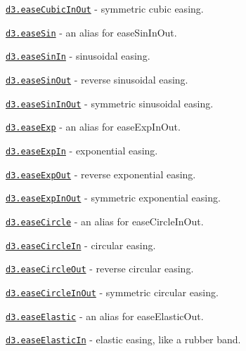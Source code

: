 \begin{DoxyItemize}
\item \href{https://github.com/d3/d3-ease/blob/master/README.md#easeCubicInOut}{\tt d3.\+ease\+Cubic\+In\+Out} -\/ symmetric cubic easing.
\item \href{https://github.com/d3/d3-ease/blob/master/README.md#easeSin}{\tt d3.\+ease\+Sin} -\/ an alias for ease\+Sin\+In\+Out.
\item \href{https://github.com/d3/d3-ease/blob/master/README.md#easeSinIn}{\tt d3.\+ease\+Sin\+In} -\/ sinusoidal easing.
\item \href{https://github.com/d3/d3-ease/blob/master/README.md#easeSinOut}{\tt d3.\+ease\+Sin\+Out} -\/ reverse sinusoidal easing.
\item \href{https://github.com/d3/d3-ease/blob/master/README.md#easeSinInOut}{\tt d3.\+ease\+Sin\+In\+Out} -\/ symmetric sinusoidal easing.
\item \href{https://github.com/d3/d3-ease/blob/master/README.md#easeExp}{\tt d3.\+ease\+Exp} -\/ an alias for ease\+Exp\+In\+Out.
\item \href{https://github.com/d3/d3-ease/blob/master/README.md#easeExpIn}{\tt d3.\+ease\+Exp\+In} -\/ exponential easing.
\item \href{https://github.com/d3/d3-ease/blob/master/README.md#easeExpOut}{\tt d3.\+ease\+Exp\+Out} -\/ reverse exponential easing.
\item \href{https://github.com/d3/d3-ease/blob/master/README.md#easeExpInOut}{\tt d3.\+ease\+Exp\+In\+Out} -\/ symmetric exponential easing.
\item \href{https://github.com/d3/d3-ease/blob/master/README.md#easeCircle}{\tt d3.\+ease\+Circle} -\/ an alias for ease\+Circle\+In\+Out.
\item \href{https://github.com/d3/d3-ease/blob/master/README.md#easeCircleIn}{\tt d3.\+ease\+Circle\+In} -\/ circular easing.
\item \href{https://github.com/d3/d3-ease/blob/master/README.md#easeCircleOut}{\tt d3.\+ease\+Circle\+Out} -\/ reverse circular easing.
\item \href{https://github.com/d3/d3-ease/blob/master/README.md#easeCircleInOut}{\tt d3.\+ease\+Circle\+In\+Out} -\/ symmetric circular easing.
\item \href{https://github.com/d3/d3-ease/blob/master/README.md#easeElastic}{\tt d3.\+ease\+Elastic} -\/ an alias for ease\+Elastic\+Out.
\item \href{https://github.com/d3/d3-ease/blob/master/README.md#easeElasticIn}{\tt d3.\+ease\+Elastic\+In} -\/ elastic easing, like a rubber band.

\end{DoxyItemize}
